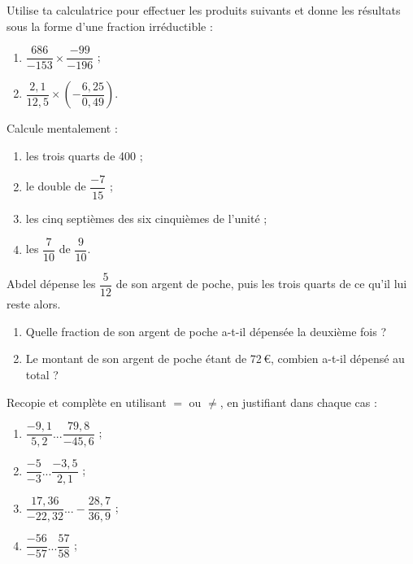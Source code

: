 \begin{exercice}
Utilise ta calculatrice pour effectuer les produits suivants et donne les résultats sous la forme d'une fraction irréductible :
\begin{enumerate}
\item $\dfrac{686}{-153} \times \dfrac{-99}{-196}$ ; 
\item $\dfrac{2,1}{12,5} \times \left(-\dfrac{6,25}{0,49}\right)$.
\end{enumerate}
\end{exercice}



\begin{exercice}
Calcule mentalement :
\begin{enumerate}
\item les trois quarts de 400 ;
\item le double de $\dfrac{-7}{15}$ ;
\item les cinq septièmes des six cinquièmes de l'unité ;
\item les $\dfrac{7}{10}$ de $\dfrac{9}{10}$.
\end{enumerate}
\end{exercice}




\begin{exercice}[Dépense]
Abdel dépense les $\dfrac{5}{12}$ de son argent de poche, puis les trois quarts de ce qu'il lui reste alors.
\begin{enumerate}
\item Quelle fraction de son argent de poche a-t-il dépensée la deuxième fois ?
\item Le montant de son argent de poche étant de 72\,€, combien a-t-il dépensé au total ?
\end{enumerate}
\end{exercice}



\begin{exercice}
Recopie et complète en utilisant $=$ ou $\neq$, en justifiant dans chaque cas :
\begin{enumerate}
\item $\dfrac{-9,1}{5,2} ... \dfrac{79,8}{-45,6}$ ;
\item $\dfrac{-5}{-3} ... \dfrac{-3,5}{2,1}$ ;
\item $\dfrac{17,36}{-22,32} ... -\dfrac{28,7}{36,9}$ ;
\item $\dfrac{-56}{-57} ... \dfrac{57}{58}$ ;
\end{enumerate}
\end{exercice}





